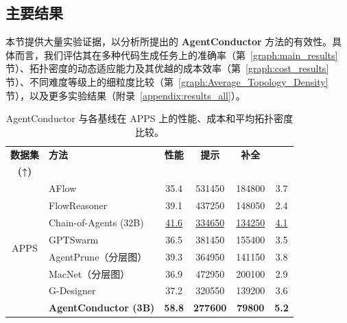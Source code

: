 \documentclass{article}
\theoremstyle{definition}
\begin{document}
\subsection{主要结果}
本节提供大量实验证据，以分析所提出的 \textbf{AgentConductor} 方法的有效性。具体而言，我们评估其在多种代码生成任务上的准确率（第~\ref{graph:main_results} 节）、拓扑密度的动态适应能力及其优越的成本效率（第~\ref{graph:cost_results} 节）、不同难度等级上的细粒度比较（第~\ref{graph:Average_Topology_Density} 节），以及更多实验结果（附录~\ref{appendix:results_all}）。
\vspace{-1.15em}
\begin{table}[!t] %
\centering        %
\caption{AgentConductor 与各基线在 APPS 上的性能、成本和平均拓扑密度比较。} %
\vspace{-0.4em}   %
\label{tab:costs_and_topos} %

\setlength{\tabcolsep}{1.2pt} %
\renewcommand{\arraystretch}{1.2} %
\footnotesize   %

\begin{tabular}{c|p{2.9cm}cccc} %
\toprule
\textbf{数据集} & \textbf{方法} & \textbf{性能} & \textbf{提示} & \textbf{补全} &
\makecell{\textbf{$\mathcal{S}_{\text{complex}}$}\\\textbf{(↑)}} \\
\midrule
\multirow{8}{*}{APPS}
& AFlow & 35.4 & 531450 & 184800 & 3.7 \\
& FlowReasoner & 39.1 & 437250 & 148050 & 2.4 \\
& Chain-of-Agents (32B) & \underline{41.6} & \underline{334650} & \underline{134250} & \underline{4.1} \\
\cmidrule(lr){2-6}
& GPTSwarm & 36.5 & 381450 & 155400 & 3.5 \\
& AgentPrune（分层图） & 39.3 & 364950 & 141150 & 3.8 \\
& MacNet（分层图） & 36.9 & 472950 & 200100 & 2.9 \\
& G-Designer & 37.2 & 320550 & 139200 & 3.6 \\
& \cellcolor[RGB]{220,235,245}\textbf{AgentConductor (3B)}
& \cellcolor[RGB]{220,235,245}\textbf{58.8}
& \cellcolor[RGB]{220,235,245}\textbf{277600}
& \cellcolor[RGB]{220,235,245}\textbf{79800}
& \cellcolor[RGB]{220,235,245}\textbf{5.2} \\
\bottomrule
\end{tabular}


\end{table}
\end{document}

